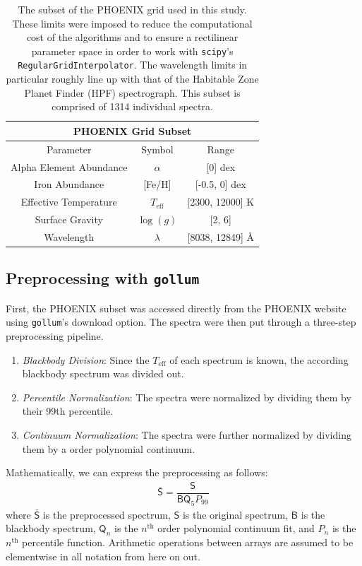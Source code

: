 \documentclass[twocolumn]{aastex631}
\begin{document}
\begin{table}[h!]
    \hspace*{-1.35cm}\begin{tabular}{|c|c|c|}
        \hline
        \multicolumn{3}{|c|}{\textbf{PHOENIX Grid Subset}}\\
        \hline\hline
        Parameter & Symbol & Range\\
        \hline
        Alpha Element Abundance & $\alpha$ & [0] dex\\
        Iron Abundance & [Fe/H] & [-0.5, 0] dex\\
        Effective Temperature & $T_{\mathrm{eff}}$ & [2300, 12000] K\\
        Surface Gravity & $\log(g)$ & [2, 6]\\
        Wavelength & $\lambda$ & [8038, 12849] \AA\\
        \hline
    \end{tabular}
    \caption{The subset of the PHOENIX grid used in this study. These limits 
    were imposed to reduce the computational cost of the algorithms and to 
    ensure a rectilinear parameter space in order to work with \texttt{scipy}'s
    \texttt{RegularGridInterpolator}. The wavelength limits in particular 
    roughly line up with that of the Habitable Zone Planet Finder (HPF) 
    spectrograph. This subset is comprised of 1314 individual spectra.}
\end{table}

\subsection{Preprocessing with \texttt{gollum}}
First, the PHOENIX subset was accessed directly from the PHOENIX website
using \texttt{gollum}'s download option. The spectra were then put through a 
three-step preprocessing pipeline.
\begin{enumerate}
    \item \textit{Blackbody Division}: Since the $T_{\mathrm{eff}}$ of each spectrum 
    is known, the according blackbody spectrum was divided out.
    \item \textit{Percentile Normalization}: The spectra were normalized by dividing
    them by their 99th percentile.
    \item \textit{Continuum Normalization}: The spectra were further normalized by 
    dividing them by a  order polynomial continuum.
\end{enumerate}
Mathematically, we can express the preprocessing as follows:
\begin{gather}
    \mathsf{\bar{S}} = \dfrac{\mathsf{S}}{\mathsf{B}\mathsf{Q}_5P_{99}}
\end{gather}
where $\mathsf{\bar{S}}$ is the preprocessed spectrum, $\mathsf{S}$ is the 
original spectrum,  $\mathsf{B}$ is the blackbody spectrum, $\mathsf{Q}_n$ 
is the $n^\mathrm{th}$ order polynomial continuum fit, and $P_n$ is the 
$n^\mathrm{th}$ percentile function. Arithmetic operations between arrays 
are assumed to be elementwise in all notation from here on out.
\end{document}
